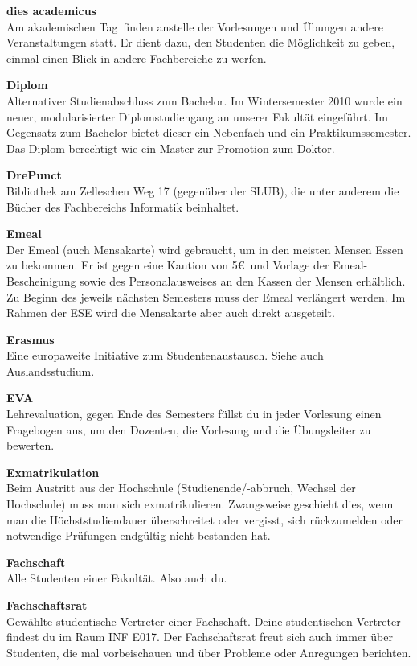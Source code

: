 \textbf{dies academicus} \\
Am \glqq akademischen Tag\grqq\ finden anstelle der Vorlesungen und Übungen andere Veranstaltungen statt.
Er dient dazu, den Studenten die Möglichkeit zu geben, einmal einen Blick in andere Fachbereiche zu werfen.

\textbf{Diplom} \\
Alternativer Studienabschluss zum Bachelor.
Im Wintersemester 2010 wurde ein neuer, modularisierter Diplomstudiengang an unserer Fakultät eingeführt.
Im Gegensatz zum Bachelor bietet dieser ein Nebenfach und ein Praktikumssemester.
Das Diplom berechtigt wie ein Master zur Promotion zum Doktor.

\textbf{DrePunct} \\
Bibliothek am Zelleschen Weg 17 (gegenüber der SLUB), die unter anderem die Bücher des Fachbereichs Informatik beinhaltet.

\textbf{Emeal} \\
Der Emeal (auch Mensakarte) wird gebraucht, um in den meisten Mensen Essen zu bekommen.
Er ist gegen eine Kaution von 5\euro\ und Vorlage der Emeal-Bescheinigung sowie des Personalausweises an den Kassen der Mensen erhältlich.
Zu Beginn des jeweils nächsten Semesters muss der Emeal verlängert werden.
Im Rahmen der ESE wird die Mensakarte aber auch direkt ausgeteilt.

\textbf{Erasmus} \\
Eine europaweite Initiative zum Studentenaustausch.
Siehe auch Auslandsstudium.

\textbf{EVA} \\
Lehrevaluation, gegen Ende des Semesters füllst du in jeder Vorlesung einen Fragebogen aus, um den Dozenten, die Vorlesung und die Übungsleiter zu bewerten.

\textbf{Exmatrikulation} \\
Beim Austritt aus der Hochschule (Studienende/-abbruch, Wechsel der Hochschule) muss man sich exmatrikulieren.
Zwangsweise geschieht dies, wenn man die Höchststudiendauer überschreitet oder vergisst, sich rückzumelden oder notwendige Prüfungen endgültig nicht bestanden hat.

\textbf{Fachschaft} \\
Alle Studenten einer Fakultät. Also auch du.

\textbf{Fachschaftsrat} \\
Gewählte studentische Vertreter einer Fachschaft.
Deine studentischen Vertreter findest du im Raum INF E017.
Der Fachschaftsrat freut sich auch immer über Studenten, die mal vorbeischauen und über Probleme oder Anregungen berichten.

